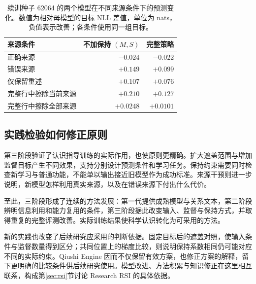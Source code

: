 \begin{table}[htbp]
\caption{续训种子 62064 的两个模型在不同来源条件下的预测变化。数值为相对母模型的目标 NLL 差值，单位为 nats，负值表示改善；各条件使用同一组目标。}
\label{tab:source_final}
\begin{tabularx}{\linewidth}{@{}Yrr@{}}
\toprule 来源条件 & 不加保持 $(M,S)$ & 完整策略\\\midrule
正确来源 & $-0.024$ & $-0.022$\\
错误来源 & $+0.149$ & $+0.099$\\
仅保留重述 & $+0.107$ & $+0.076$\\
完整行中擦除当前来源 & $+0.210$ & $+0.127$\\
完整行中擦除全部来源 & $+0.0248$ & $+0.0101$\\
\bottomrule
\end{tabularx}
\end{table}

\subsection{实践检验如何修正原则}

第三阶段验证了认识指导训练的实际作用，也使原则更精确。扩大遮盖范围与增加监督目标产生不同效果，支持分别设计预测条件和学习任务。保持约束需要同时检查新学习与普通功能，不能单以输出接近旧模型作为成功标准。来源干预则进一步说明，新模型怎样利用真实来源，以及在错误来源下付出什么代价。

至此，三阶段形成了连续的方法发展：第一代提供成熟模型与关系文本，第二阶段辨明信息利用和能力复用的条件，第三阶段据此改变输入、监督与保持方式，并取得重复的完整评测改善。实际训练结果使科学认识转化为可采用的方法。

新的实践也改变了后续研究应采用的判断依据。固定目标后的遮盖对照，使输入条件与监督数量得到区分；共同位置上的梯度比较，则说明保持系数相同仍可能对应不同的实际约束。Qiushi Engine 因而不仅保留有效方案，也修正方案的解释，留下更明确的比较条件供后续研究使用。模型改进、方法积累与知识修正在这里相互联系，构成第\ref{sec:rsi}节讨论 Research RSI 的具体依据。
